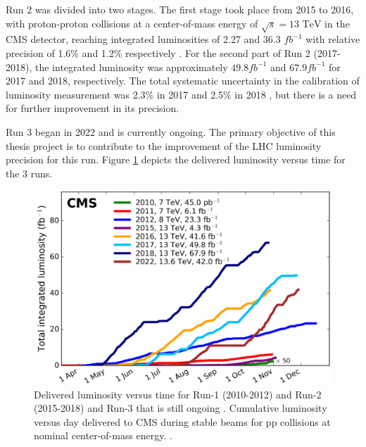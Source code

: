 Run 2 was divided into two stages. The first stage took place from 2015 to 2016, with proton-proton collisions at a center-of-mass energy of $\sqrt{s}=\text{13 TeV}$ in the CMS detector, reaching integrated luminosities of 2.27 and 36.3 $fb^{-1}$ with relative precision of 1.6\% and 1.2\% respectively \cite{lumi_precise_2015_2016}. For the second part of Run 2 (2017-2018), the integrated luminosity was approximately $49.8 fb^{-1}$ and $67.9 fb^{-1}$ for 2017 and 2018, respectively. The total systematic uncertainty in the calibration of luminosity measurement was 2.3\% in 2017 \cite{pas_17} and 2.5\% in 2018 \cite{pas_18}, but there is a need for further improvement in its precision.

Run 3 began in 2022 and is currently ongoing. The primary objective of this thesis project is to contribute to the improvement of the LHC luminosity precision for this run.
Figure \ref{lumi_per_year_int} depicts the delivered luminosity versus time for the 3 runs.

\begin{center}
  \begin{figure}[h]
    \centering
    \includegraphics[scale=.28]{Chapter1/int_lumi_per_year.png}
    \caption[CMS Luminosity per year]{Delivered luminosity versus time for Run-1 (2010-2012)\cite{pas_17} and Run-2 (2015-2018)\cite{pas_18} and Run-3 that is still ongoing . Cumulative luminosity versus day delivered to CMS during stable beams for pp collisions at nominal center-of-mass energy.  \cite{wikicern}.}
    \label{lumi_per_year_int}
  \end{figure}
\end{center}
